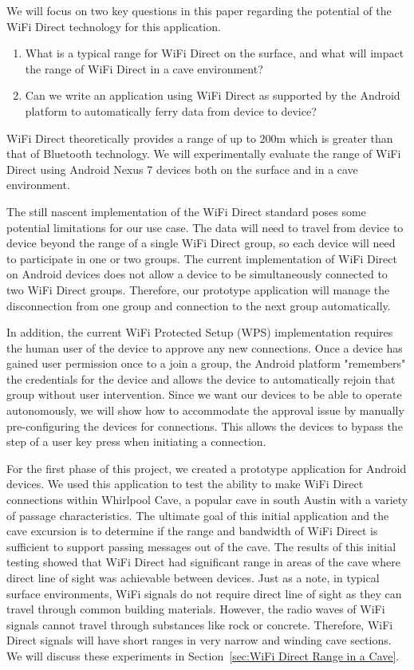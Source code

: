 \documentclass[10pt,twocolumn]{article}
\begin{document}
We will focus on two key questions in this paper regarding the potential of the WiFi Direct technology for this application.
\begin{enumerate}
\item What is a typical range for WiFi Direct on the surface, and what will impact the range of WiFi Direct in a cave environment?
\item Can we write an application using WiFi Direct as supported by the Android platform to automatically ferry data from device to device?
\end{enumerate} 

WiFi Direct theoretically provides a range of up to 200m which is greater than that of Bluetooth technology.
We will experimentally evaluate the range of WiFi Direct using Android Nexus 7 devices both on the surface and in a cave environment.

The still nascent implementation of the WiFi Direct standard poses some potential limitations for our use case.
The data will need to travel from device to device beyond the range of a single WiFi Direct group, 
so each device will need to participate in one or two groups. 
The current implementation of WiFi Direct on Android devices does not allow a device to be simultaneously connected to two WiFi Direct groups.
Therefore, our prototype application will manage the disconnection from one group and connection to the next group automatically.

In addition, the current WiFi Protected Setup (WPS) implementation requires the human user of the device to approve any new connections.
Once a device has gained user permission once to a join a group, the Android platform "remembers" the credentials for the device and allows the device to automatically rejoin that group without user intervention.
Since we want our devices to be able to operate autonomously, we will show how to accommodate the approval issue by manually pre-configuring the devices for connections.
This allows the devices to bypass the step of a user key press when initiating a connection.
 
For the first phase of this project, we created a prototype application for Android devices. 
We used this application to test the ability to make WiFi Direct connections within Whirlpool Cave, a popular cave in south Austin with a variety of passage characteristics. 
The ultimate goal of this initial application and the cave excursion is to determine if the range and bandwidth of WiFi Direct is sufficient to support passing messages out of the cave.
The results of this initial testing showed that WiFi Direct had significant range in areas of the cave where direct line of sight was achievable between devices.
Just as a note, in typical surface environments, WiFi signals do not require direct line of sight as they can travel through common building materials.
However, the radio waves of WiFi signals cannot travel through substances like rock or concrete.
Therefore, WiFi Direct signals will have short ranges in very narrow and winding cave sections.
We will discuss these experiments in Section~\ref{sec:WiFi Direct Range in a Cave}.
\end{document}
